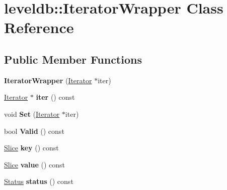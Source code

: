 \hypertarget{classleveldb_1_1_iterator_wrapper}{}\section{leveldb\+:\+:Iterator\+Wrapper Class Reference}
\label{classleveldb_1_1_iterator_wrapper}
\subsection*{Public Member Functions}
\begin{DoxyCompactItemize}
\item 
\mbox{\label{classleveldb_1_1_iterator_wrapper_ab4714f21809e357b4d5b6bdbec4fe98f}} 
{\bfseries Iterator\+Wrapper} (\mbox{\hyperlink{classleveldb_1_1_iterator}{Iterator}} $\ast$iter)
\item 
\mbox{\label{classleveldb_1_1_iterator_wrapper_a6fa1f15e4db874e01569b3953bf16624}} 
\mbox{\hyperlink{classleveldb_1_1_iterator}{Iterator}} $\ast$ {\bfseries iter} () const
\item 
\mbox{\label{classleveldb_1_1_iterator_wrapper_ae14dd8ac682dd596ba2a3d2407e1a4fd}} 
void {\bfseries Set} (\mbox{\hyperlink{classleveldb_1_1_iterator}{Iterator}} $\ast$iter)
\item 
\mbox{\label{classleveldb_1_1_iterator_wrapper_a4567a75f45c4e68d5b7336a31078e1a7}} 
bool {\bfseries Valid} () const
\item 
\mbox{\label{classleveldb_1_1_iterator_wrapper_a25e25f8abc95c67bf36dbe623fc869f0}} 
\mbox{\hyperlink{classleveldb_1_1_slice}{Slice}} {\bfseries key} () const
\item 
\mbox{\label{classleveldb_1_1_iterator_wrapper_a4030cdddd52a5b22f1e6144b1262efa7}} 
\mbox{\hyperlink{classleveldb_1_1_slice}{Slice}} {\bfseries value} () const
\item 
\mbox{\label{classleveldb_1_1_iterator_wrapper_a2f2b4510251ac93391ff38bcc41c312c}} 
\mbox{\hyperlink{classleveldb_1_1_status}{Status}} {\bfseries status} () const

\end{DoxyCompactItemize}
